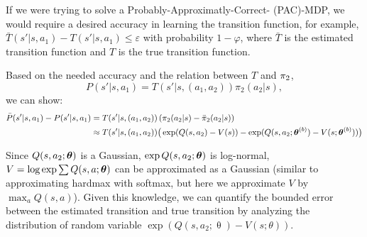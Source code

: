     If we were trying to solve a Probably-Approximatly-Correct- (PAC)-MDP, we would require a desired accuracy in
    learning the transition function, for example, $\bar T(s'|s,a_1) - T(s'|s,a_1) \le \varepsilon$ with probability
    $1-\varphi$, where $\bar T$ is the estimated transition function and $T$ is the true transition function.

    Based on the needed accuracy and the relation between $T$ and $\pi_{2}$,
    \[
    P(s'|s,a_1) = T(s'|s,(a_1,a_2))\pi_2(a_2|s),
    \]
    we can show:
    \begin{align*}
        \bar P(s'|s,a_1)  -P(s'|s,a_1)
        & = T(s'|s,(a_1,a_2))\left( \pi_2(a_2|s) - \bar \pi_2(a_2|s)
        \right)\\
        & \approx T(s'|s,(a_1,a_2))\big(\exp(Q(s,a_2)-V(s)) - \exp(Q(s,a_2;\boldsymbol{\mathbb{\theta}}^{(b)})-V(s;\boldsymbol{\mathbb{\theta}}^{(b)})) \big)
    \end{align*}

    Since $Q(s,a_2;\boldsymbol{\mathbb{\theta}})$ is a Gaussian, $\exp Q(s,a_2;\boldsymbol{\mathbb{\theta}})$ is log-normal, ${V =\log \exp \sum
    Q(s,a;\boldsymbol{\mathbb{\theta}})}$ can be approximated as a Gaussian (similar to approximating hardmax with softmax, but here we
    approximate $V$ by $\max_a Q(s,a)$). Given this knowledge, we can quantify the bounded error between the estimated
    transition and true transition by analyzing the distribution of random variable
    $\exp(Q(s,a_2;\uptheta)-V(s;\theta))$.



